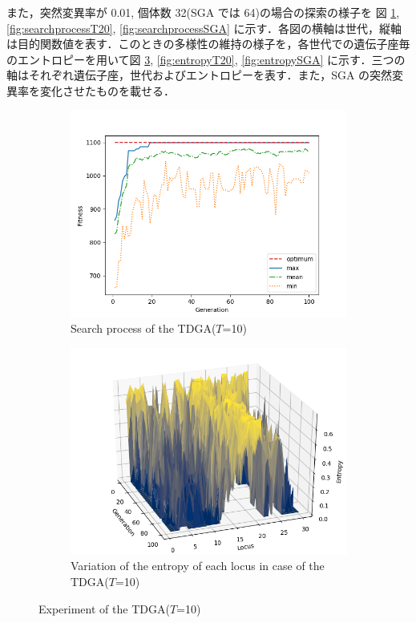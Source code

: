\documentclass[onecolumn]{ujarticle}   %
\begin{document}
	また，突然変異率が 0.01, 個体数 32(SGA では 64)の場合の探索の様子を 図 \ref{fig:searchprocessT10}, \ref{fig:searchprocessT20}, \ref{fig:searchprocessSGA} に示す．各図の横軸は世代，縦軸は目的関数値を表す．このときの多様性の維持の様子を，各世代での遺伝子座毎のエントロピーを用いて図 \ref{fig:entropyT10}, \ref{fig:entropyT20}, \ref{fig:entropySGA} に示す．三つの軸はそれぞれ遺伝子座，世代およびエントロピーを表す．また，SGA の突然変異率を変化させたものを載せる．

	\begin{figure}[h]
		\vspace{-8mm}
		\begin{subfigure}{0.49\columnwidth}
			\includegraphics[width=1.0\columnwidth]{figure/knapsackTDGA_stats_T_10_mut_001_Np_32.png}
			\caption{Search process of the TDGA($T$=10)}
			\label{fig:searchprocessT10}
		\end{subfigure}
		\begin{subfigure}{0.49\columnwidth}
			\includegraphics[width=1.0\columnwidth]{figure/knapsackTDGA_T_10_mut_001_Np_32.png}
			\caption{Variation of the entropy of each locus in case of the TDGA($T$=10)}
			\label{fig:entropyT10}
		\end{subfigure}
		\caption{Experiment of the TDGA($T$=10)}
	\end{figure}
\end{document}
